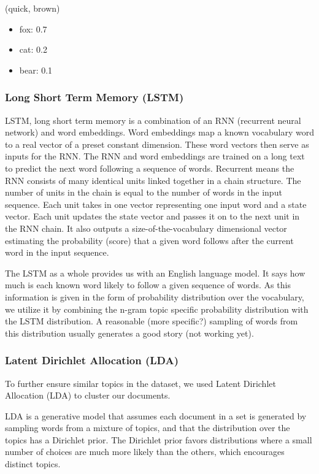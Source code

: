 \documentclass[12pt,a4paper,utf8]{article}
\begin{document}
(quick, brown)
\begin{itemize}
\item fox: 0.7
\item cat: 0.2
\item bear: 0.1
\end{itemize}

\subsubsection{Long Short Term Memory (LSTM)}
LSTM, long short term memory is a combination of an RNN (recurrent neural network) and word embeddings. Word embeddings map a known vocabulary word to a real vector of a preset constant dimension. These word vectors then serve as inputs for the RNN. The RNN and word embeddings are trained on a long text to predict the next word following a sequence of words. Recurrent means the RNN consists of many identical units linked together in a chain structure. The number of units in the chain is equal to the number of words in the input sequence. Each unit takes in one vector representing one input word and a state vector. Each unit updates the state vector and passes it on to the next unit in the RNN chain. It also outputs a size-of-the-vocabulary dimensional vector estimating the probability (score) that a given word follows after the current word in the input sequence.

The LSTM as a whole provides us with an English language model. It says how much is each known word likely to follow a given sequence of words. As this information is given in the form of probability distribution over the vocabulary, we utilize it by combining the n-gram topic specific probability distribution with the LSTM distribution. A reasonable (more specific?) sampling of words from this distribution usually generates a good story (not working yet).

\subsubsection{Latent Dirichlet Allocation (LDA)}
To further ensure similar topics in the dataset, we used Latent Dirichlet Allocation (LDA)\cite{blei2003latent} to cluster our documents.

LDA is a generative model that assumes each document in a set is generated by sampling words from a mixture of topics, and that the distribution over the topics has a Dirichlet prior. The Dirichlet prior favors distributions where a small number of choices are much more likely than the others, which encourages distinct topics.
\end{document}
